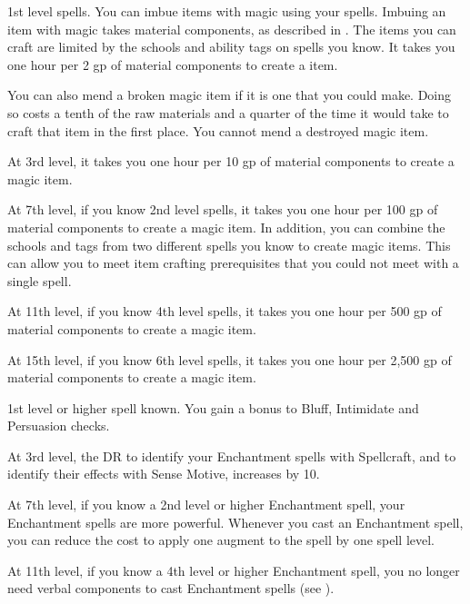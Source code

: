     \featpre 1st level spells.
    \featben You can imbue items with magic using your spells.
    Imbuing an item with magic takes material components, as described in .
    The items you can craft are limited by the schools and ability tags on spells you know.
    It takes you one hour per 2 gp of material components to create a item.

    You can also mend a broken magic item if it is one that you could make.
    Doing so costs a tenth of the raw materials and a quarter of the time it would take to craft that item in the first place.
    You cannot mend a destroyed magic item.

    At 3rd level, it takes you one hour per 10 gp of material components to create a magic item. %

    At 7th level, if you know 2nd level spells, it takes you one hour per 100 gp of material components to create a magic item. %
    In addition, you can combine the schools and tags from two different spells you know to create magic items.
    This can allow you to meet item crafting prerequisites that you could not meet with a single spell.

    At 11th level, if you know 4th level spells, it takes you one hour per 500 gp of material components to create a magic item. %

    At 15th level, if you know 6th level spells, it takes you one hour per 2,500 gp of material components to create a magic item. %

    \featpres 1st level or higher  spell known.
    \featben You gain a  bonus to Bluff, Intimidate and Persuasion checks.

    At 3rd level, the DR to identify your Enchantment spells with Spellcraft, and to identify their effects with Sense Motive, increases by 10.

    At 7th level, if you know a 2nd level or higher Enchantment spell, your Enchantment spells are more powerful.
    Whenever you cast an Enchantment spell, you can reduce the cost to apply one augment to the spell by one spell level.

    At 11th level, if you know a 4th level or higher Enchantment spell, you no longer need verbal components to cast Enchantment spells (see ).

